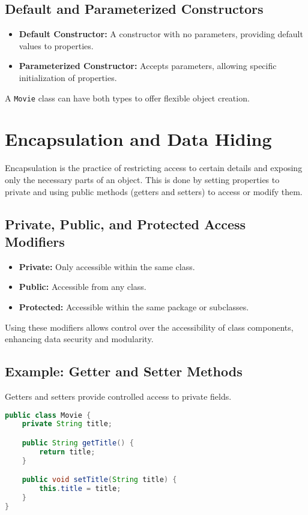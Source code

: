 \documentclass{article}
\begin{document}
\subsection{Default and Parameterized Constructors}
\begin{itemize}
    \item \textbf{Default Constructor:} A constructor with no parameters, providing default values to properties.
    \item \textbf{Parameterized Constructor:} Accepts parameters, allowing specific initialization of properties.
\end{itemize}
A \texttt{Movie} class can have both types to offer flexible object creation.

\section{Encapsulation and Data Hiding}
Encapsulation is the practice of restricting access to certain details and exposing only the necessary parts of an object. This is done by setting properties to private and using public methods (getters and setters) to access or modify them.

\subsection{Private, Public, and Protected Access Modifiers}
\begin{itemize}
    \item \textbf{Private:} Only accessible within the same class.
    \item \textbf{Public:} Accessible from any class.
    \item \textbf{Protected:} Accessible within the same package or subclasses.
\end{itemize}
Using these modifiers allows control over the accessibility of class components, enhancing data security and modularity.

\subsection{Example: Getter and Setter Methods}
Getters and setters provide controlled access to private fields.
\begin{lstlisting}[language=Java]
public class Movie {
    private String title;

    public String getTitle() {
        return title;
    }

    public void setTitle(String title) {
        this.title = title;
    }
}
\end{lstlisting}
\end{document}
